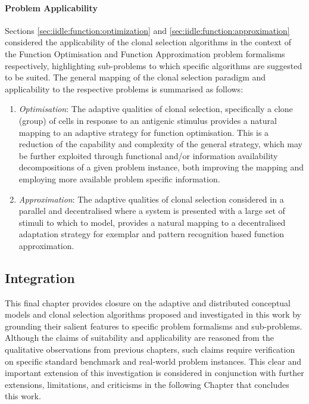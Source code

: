 %
%
\paragraph{Problem Applicability}
Sections \ref{sec:iidle:function:optimization} and \ref{sec:iidle:function:approximation} considered the applicability of the clonal selection algorithms in the context of the Function Optimisation and Function Approximation problem formalisms respectively, highlighting sub-problems to which specific algorithms are suggested to be suited. The general mapping of the clonal selection paradigm and applicability to the respective problems is summarised as follows:

\begin{enumerate}
	\item \emph{Optimisation}: The adaptive qualities of clonal selection, specifically a clone (group) of cells in response to an antigenic stimulus provides a natural mapping to an adaptive strategy for function optimisation. This is a reduction of the capability and complexity of the general strategy, which may be further exploited through functional and/or information availability decompositions of a given problem instance, both improving the mapping and employing more available problem specific information.
	\item \emph{Approximation}: The adaptive qualities of clonal selection considered in a parallel and decentralised where a system is presented with a large set of stimuli to which to model, provides a natural mapping to a decentralised adaptation strategy for exemplar and pattern recognition based function approximation. 
\end{enumerate}

%
%
\subsection{Integration}
This final chapter provides closure on the adaptive and distributed conceptual models and clonal selection algorithms proposed and investigated in this work by grounding their salient features to specific problem formalisms and sub-problems. Although the claims of suitability and applicability are reasoned from the qualitative observations from previous chapters, such claims require verification on specific standard benchmark and real-world problem instances.
This clear and important extension of this investigation is considered in conjunction with further extensions, limitations, and criticisms in the following Chapter that concludes this work.

